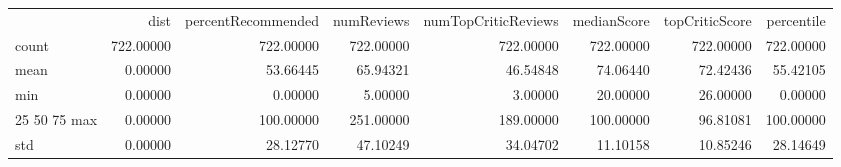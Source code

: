\begin{tabular}{lrrrrrrr}
 & dist & percentRecommended & numReviews & numTopCriticReviews & medianScore & topCriticScore & percentile \\
count & 722.00000 & 722.00000 & 722.00000 & 722.00000 & 722.00000 & 722.00000 & 722.00000 \\
mean & 0.00000 & 53.66445 & 65.94321 & 46.54848 & 74.06440 & 72.42436 & 55.42105 \\
min & 0.00000 & 0.00000 & 5.00000 & 3.00000 & 20.00000 & 26.00000 & 0.00000 \\
25%
50%
75%
max & 0.00000 & 100.00000 & 251.00000 & 189.00000 & 100.00000 & 96.81081 & 100.00000 \\
std & 0.00000 & 28.12770 & 47.10249 & 34.04702 & 11.10158 & 10.85246 & 28.14649 \\
\end{tabular}
